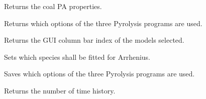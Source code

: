\documentclass[letterpaper,10pt,english]{sphinxmanual}
\begin{document}
\begin{fulllineitems}
\begin{fulllineitems}
\end{fulllineitems}


\begin{fulllineitems}
\label{GUI:GUI.InfosFromGUI.PA}
Returns the coal PA properties.

\end{fulllineitems}


\begin{fulllineitems}
\label{GUI:GUI.InfosFromGUI.RunPyrolProg}
Returns which options of the three Pyrolysis programs are used.

\end{fulllineitems}


\begin{fulllineitems}
\label{GUI:GUI.InfosFromGUI.RunPyrolProgReverse}
Returns the GUI column bar index of the models selected.

\end{fulllineitems}


\begin{fulllineitems}
\label{GUI:GUI.InfosFromGUI.SetArrhSpec}
Sets which species shall be fitted for Arrhenius.

\end{fulllineitems}


\begin{fulllineitems}
\label{GUI:GUI.InfosFromGUI.SetRunPyrolProg}
Saves which options of the three Pyrolysis programs are used.

\end{fulllineitems}


\begin{fulllineitems}
\label{GUI:GUI.InfosFromGUI.TimeHistories}
Returns the number of time history.


\end{fulllineitems}
\end{fulllineitems}
\end{document}
